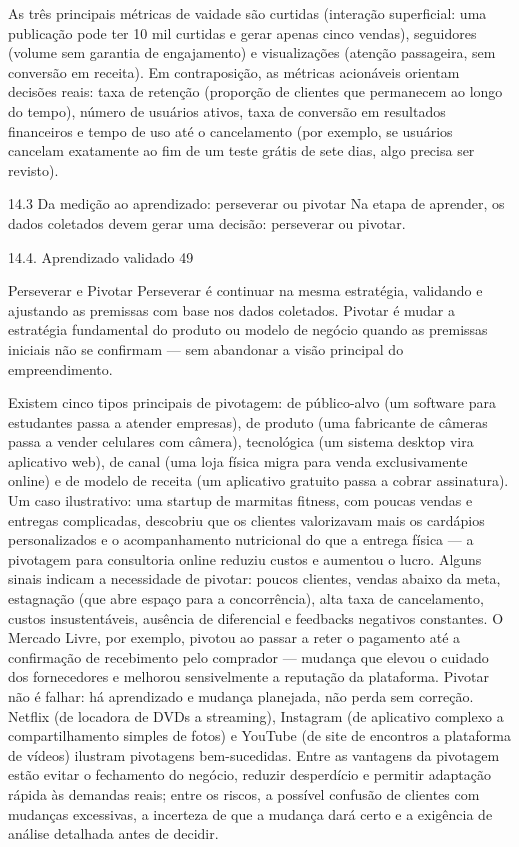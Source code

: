 As três principais métricas de vaidade são curtidas (interação superficial: uma publicação pode ter 10 mil curtidas e gerar apenas cinco vendas), seguidores (volume sem garantia de engajamento) e visualizações (atenção passageira, sem conversão em receita). Em contraposição, as métricas acionáveis orientam decisões reais: taxa de retenção (proporção de clientes que permanecem ao longo do tempo), número de usuários ativos, taxa de conversão em resultados financeiros e tempo de uso até o cancelamento (por exemplo, se usuários cancelam exatamente ao fim de um teste grátis de sete dias, algo precisa ser revisto).

14.3 Da medição ao aprendizado: perseverar ou pivotar Na etapa de aprender, os dados coletados devem gerar uma decisão: perseverar ou pivotar.

14.4. Aprendizado validado 49

Perseverar e Pivotar Perseverar é continuar na mesma estratégia, validando e ajustando as premissas com base nos dados coletados. Pivotar é mudar a estratégia fundamental do produto ou modelo de negócio quando as premissas iniciais não se confirmam — sem abandonar a visão principal do empreendimento.

Existem cinco tipos principais de pivotagem: de público-alvo (um software para estudantes passa a atender empresas), de produto (uma fabricante de câmeras passa a vender celulares com câmera), tecnológica (um sistema desktop vira aplicativo web), de canal (uma loja física migra para venda exclusivamente online) e de modelo de receita (um aplicativo gratuito passa a cobrar assinatura). Um caso ilustrativo: uma startup de marmitas fitness, com poucas vendas e entregas complicadas, descobriu que os clientes valorizavam mais os cardápios personalizados e o acompanhamento nutricional do que a entrega física — a pivotagem para consultoria online reduziu custos e aumentou o lucro. Alguns sinais indicam a necessidade de pivotar: poucos clientes, vendas abaixo da meta, estagnação (que abre espaço para a concorrência), alta taxa de cancelamento, custos insustentáveis, ausência de diferencial e feedbacks negativos constantes. O Mercado Livre, por exemplo, pivotou ao passar a reter o pagamento até a confirmação de recebimento pelo comprador — mudança que elevou o cuidado dos fornecedores e melhorou sensivelmente a reputação da plataforma. Pivotar não é falhar: há aprendizado e mudança planejada, não perda sem correção. Netflix (de locadora de DVDs a streaming), Instagram (de aplicativo complexo a compartilhamento simples de fotos) e YouTube (de site de encontros a plataforma de vídeos) ilustram pivotagens bem-sucedidas. Entre as vantagens da pivotagem estão evitar o fechamento do negócio, reduzir desperdício e permitir adaptação rápida às demandas reais; entre os riscos, a possível confusão de clientes com mudanças excessivas, a incerteza de que a mudança dará certo e a exigência de análise detalhada antes de decidir.

